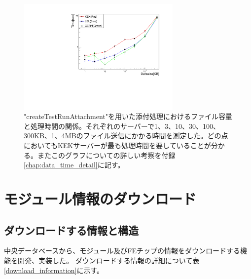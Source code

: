 \begin{figure}[bpt]\centering
  \begin{center}
    \includegraphics[width=8cm,angle=270]{./datasize_vs_time_new.pdf}
  \caption["createTestRunAttachment"を用いた添付処理におけるファイル容量と処理時間の関係]{"createTestRunAttachment"を用いた添付処理におけるファイル容量と処理時間の関係。それぞれのサーバーで1、3、10、30、100、300KB、1、4MBのファイル送信にかかる時間を測定した。どの点においてもKEKサーバーが最も処理時間を要していることが分かる。またこのグラフについての詳しい考察を付録\ref{chap:data_time_detail}に記す。}
  \label{datasize_vs_time}
  \end{center}
\end{figure}


\clearpage
\section{モジュール情報のダウンロード}
\subsection{ダウンロードする情報と構造}
中央データベースから、モジュール及びFEチップの情報をダウンロードする機能を開発、実装した。
ダウンロードする情報の詳細について表\ref{download_information}に示す。

